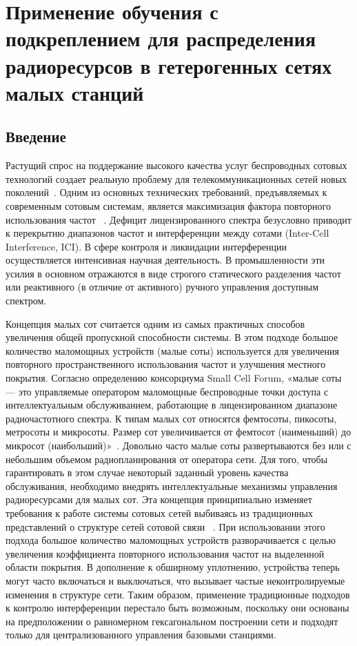 \chapter{Применение обучения с подкреплением для распределения радиоресурсов в гетерогенных сетях малых станций} \label{chapt2}

\section{Введение} \label{sect2_1}

Растущий спрос на поддержание высокого качества услуг беспроводных сотовых технологий создает реальную проблему для телекоммуникационных сетей новых поколений~\cite{TS36.300}. Одним из основных технических требований, предъявляемых к современным сотовым системам, является максимизация фактора повторного использования частот ~\cite{M.1645}. Дефицит лицензированного спектра безусловно приводит к перекрытию диапазонов частот и интерференции между сотами (Inter-Cell Interference, ICI). В сфере контроля и ликвидации интерференции осуществляется интенсивная научная деятельность. В промышленности эти усилия в основном отражаются в виде строгого статического разделения частот или реактивного (в отличие от активного) ручного управления доступным спектром.

Концепция малых сот считается одним из самых практичных способов увеличения общей пропускной способности системы. В этом подходе большое количество маломощных устройств (малые соты) используется для увеличения повторного пространственного использования частот и улучшения местного покрытия. Согласно определению консорциума Small Cell Forum, «малые соты — это управляемые оператором маломощные беспроводные точки доступа с интеллектуальным обслуживанием, работающие в лицензированном диапазоне радиочастотного спектра. К типам малых сот относятся фемтосоты, пикосоты, метросоты и микросоты. Размер сот увеличивается от фемтосот (наименьший) до микросот (наибольший)»~\cite{6171992}. Довольно часто малые соты развертываются без или с небольшим объемом радиопланирования от оператора сети. Для того, чтобы гарантировать в этом случае некоторый заданный уровень качества обслуживания, необходимо внедрять интеллектуальные механизмы управления радиоресурсами для малых сот. Эта концепция принципиально изменяет требования к работе системы сотовых сетей выбиваясь из традиционных представлений о структуре сетей сотовой связи ~\cite{6211486}. При использовании этого подхода большое количество маломощных устройств разворачивается с целью увеличения коэффициента повторного использования частот на выделенной области покрытия. В дополнение к обширному уплотнению, устройства теперь могут часто включаться и выключаться, что вызывает частые неконтролируемые изменения в структуре сети. Таким образом, применение традиционные подходов к контролю интерференции перестало быть возможным, поскольку они основаны на предположении о равномерном гексагональном построении сети и подходят только для централизованного управления базовыми станциями.

